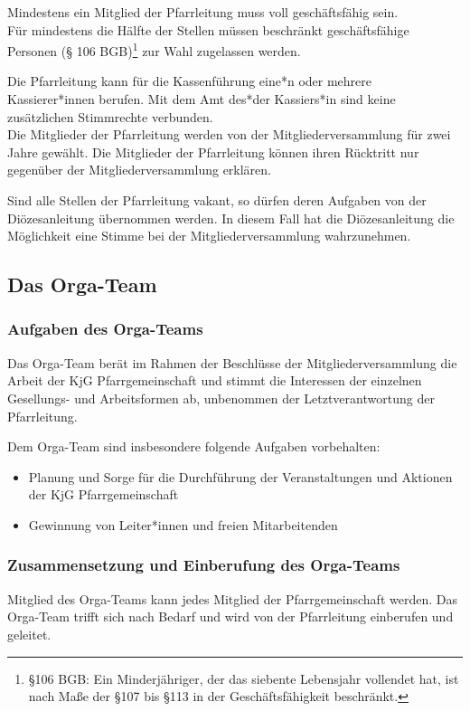 \documentclass[12pt]{report}
\begin{document}
\begin{justify}
Mindestens ein Mitglied der Pfarrleitung muss voll geschäftsfähig sein.\\
Für mindestens die Hälfte der Stellen müssen beschränkt geschäftsfähige Personen
(§ 106 BGB)\footnote{§106 BGB: Ein Minderjähriger, der das siebente Lebensjahr
  vollendet hat, ist nach Maße der §107 bis §113 in der Geschäftsfähigkeit
  beschränkt.} zur Wahl zugelassen werden.

Die Pfarrleitung kann für die Kassenführung eine*n oder mehrere Kassierer*innen berufen.
Mit dem Amt des*der Kassiers*in sind keine zusätzlichen Stimmrechte verbunden.\\

Die Mitglieder der Pfarrleitung werden von der Mitgliederversammlung für
zwei Jahre gewählt.
Die Mitglieder der Pfarrleitung können ihren Rücktritt nur
gegenüber der Mitgliederversammlung erklären.

Sind alle Stellen der Pfarrleitung vakant, so dürfen deren Aufgaben von der
Diözesanleitung übernommen werden. In diesem Fall hat die Diözesanleitung die Möglichkeit eine
Stimme bei der Mitgliederversammlung wahrzunehmen.

\subsection{Das Orga-Team}

\subsubsection{Aufgaben des Orga-Teams}

Das Orga-Team berät im Rahmen der Beschlüsse der Mitgliederversammlung die Arbeit der KjG
Pfarrgemeinschaft und stimmt die Interessen der einzelnen Gesellungs- und Arbeitsformen ab,
unbenommen der Letztverantwortung der Pfarrleitung.

Dem Orga-Team sind insbesondere folgende Aufgaben vorbehalten:
\begin{itemize}
  \item Planung und Sorge für die Durchführung der Veranstaltungen und Aktionen der KjG Pfarrgemeinschaft
  \item Gewinnung von Leiter*innen und freien Mitarbeitenden
\end{itemize}

\subsubsection{Zusammensetzung und Einberufung des Orga-Teams}
Mitglied des Orga-Teams kann jedes Mitglied der Pfarrgemeinschaft werden. Das Orga-Team
trifft sich nach Bedarf und wird von der Pfarrleitung einberufen und geleitet.


\end{justify}
\end{document}

